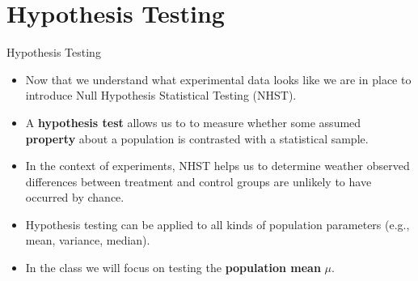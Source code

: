 \documentclass[handout]{beamer}
\begin{document}
\section{Hypothesis Testing}

\begin{frame}{Hypothesis Testing}
\scriptsize{
\begin{itemize}
 \item Now that we understand what experimental data looks like we are in place to introduce  Null Hypothesis Statistical Testing (NHST).
  \item A \textbf{hypothesis test} allows us to  to measure whether some assumed \textbf{property} about a population is contrasted with a statistical sample.
 \item In the context of experiments, NHST helps us to determine weather observed differences between treatment and control groups are unlikely to have occurred by chance. 
 
  \item Hypothesis testing can be applied to all kinds of population parameters (e.g., mean, variance, median).
 \item In the class we will focus on testing the \textbf{population mean} $\mu$.

\end{itemize}
} 
\end{frame}
\end{document}
